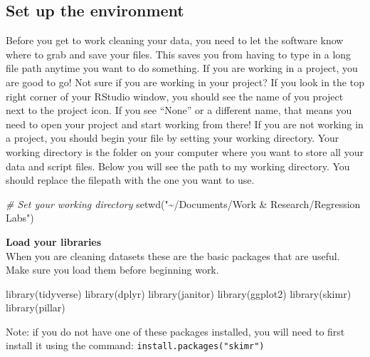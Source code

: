 \documentclass[
]{book}
\newenvironment{Shaded}{\begin{snugshade}}{\end{snugshade}}
\newcommand{\CommentTok}[1]{\textcolor[rgb]{0.56,0.35,0.01}{\textit{#1}}}
\newcommand{\FunctionTok}[1]{\textcolor[rgb]{0.00,0.00,0.00}{#1}}
\newcommand{\NormalTok}[1]{#1}
\newcommand{\StringTok}[1]{\textcolor[rgb]{0.31,0.60,0.02}{#1}}
\begin{document}
\hypertarget{environment}{%
\subsection*{Set up the environment}\label{environment}}

Before you get to work cleaning your data, you need to let the software know where to grab and save your files. This saves you from having to type in a long file path anytime you want to do something. If you are working in a project, you are good to go! Not sure if you are working in your project? If you look in the top right corner of your RStudio window, you should see the name of you project next to the project icon. If you see ``None'' or a different name, that means you need to open your project and start working from there!
If you are not working in a project, you should begin your file by setting your working directory. Your working directory is the folder on your computer where you want to store all your data and script files. Below you will see the path to my working directory. You should replace the filepath with the one you want to use.

\begin{Shaded}
\begin{Highlighting}[]
\CommentTok{\# Set your working directory }
\FunctionTok{setwd}\NormalTok{(}\StringTok{"\textasciitilde{}/Documents/Work \& Research/Regression Labs"}\NormalTok{)}
\end{Highlighting}
\end{Shaded}

\textbf{Load your libraries}\\
When you are cleaning datasets these are the basic packages that are useful. Make sure you load them before beginning work.

\begin{Shaded}
\begin{Highlighting}[]
\FunctionTok{library}\NormalTok{(tidyverse)}
\FunctionTok{library}\NormalTok{(dplyr)}
\FunctionTok{library}\NormalTok{(janitor)}
\FunctionTok{library}\NormalTok{(ggplot2)}
\FunctionTok{library}\NormalTok{(skimr)}
\FunctionTok{library}\NormalTok{(pillar)}
\end{Highlighting}
\end{Shaded}

Note: if you do not have one of these packages installed, you will need to first install it using the command: \texttt{install.packages("skimr")}
\end{document}
